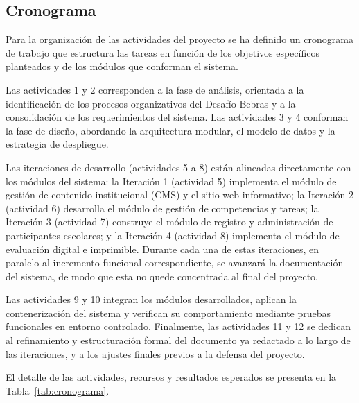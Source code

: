 \subsection{Cronograma}

    Para la organización de las actividades del proyecto se ha definido un cronograma
    de trabajo que estructura las tareas en función de los objetivos específicos
    planteados y de los módulos que conforman el sistema.

    Las actividades 1 y 2 corresponden a la fase de análisis, orientada a la
    identificación de los procesos organizativos del Desafío Bebras y a la
    consolidación de los requerimientos del sistema. Las actividades 3 y 4
    conforman la fase de diseño, abordando la arquitectura modular, el modelo
    de datos y la estrategia de despliegue.

    Las iteraciones de desarrollo (actividades 5 a 8) están alineadas directamente
    con los módulos del sistema: la Iteración 1 (actividad 5) implementa el módulo
    de gestión de contenido institucional (CMS) y el sitio web informativo;
    la Iteración 2 (actividad 6) desarrolla el módulo de gestión de competencias
    y tareas; la Iteración 3 (actividad 7) construye el módulo de registro y
    administración de participantes escolares; y la Iteración 4 (actividad 8)
    implementa el módulo de evaluación digital e imprimible. Durante cada una
    de estas iteraciones, en paralelo al incremento funcional correspondiente,
    se avanzará la documentación del sistema, de modo que esta no quede
    concentrada al final del proyecto.

    Las actividades 9 y 10 integran los módulos desarrollados, aplican la
    contenerización del sistema y verifican su comportamiento mediante pruebas
    funcionales en entorno controlado. Finalmente, las actividades 11 y 12 se
    dedican al refinamiento y estructuración formal del documento ya redactado
    a lo largo de las iteraciones, y a los ajustes finales previos a la defensa
    del proyecto.

    El detalle de las actividades, recursos y resultados esperados se presenta
    en la Tabla~\ref{tab:cronograma}.

    